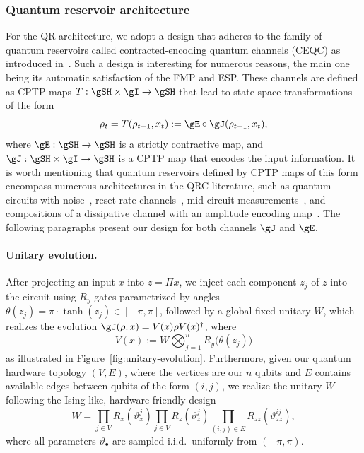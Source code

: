 \subsubsection{Quantum reservoir architecture}
For the QR architecture, we adopt a design that adheres to the family of quantum reservoirs called contracted-encoding quantum channels (CEQC) as introduced in~\cite{Martínez-Peña_Ortega_2025}. Such a design is interesting for numerous reasons, the main one being its automatic satisfaction of the FMP and ESP. These channels are defined as CPTP maps $T: \gSH \times \gI \to \gSH$ that lead to state-space transformations of the form
\begin{equation}\label{eq:CEQC}
    \rho_t = T(\rho_{t-1}, x_t) := \gE \circ \gJ(\rho_{t-1}, x_t),
\end{equation}
where $\gE: \gSH \to \gSH$ is a strictly contractive map, and $\gJ: \gSH \times \gI \to \gSH$ is a CPTP map that encodes the input information. It is worth mentioning that quantum reservoirs defined by CPTP maps of this form encompass numerous architectures in the QRC literature, such as quantum circuits with noise~\cite{Suzuki_2022, Kubota_2023}, reset-rate channels~\cite{Chen_Nurdin_Yamamoto_2020, Molteni_2023}, mid-circuit measurements~\cite{Yasuda_Suzuki_Kubota_Nakajima_Gao_Zhang_Shimono_Nurdin_Yamamoto_2023, Hu_2024}, and compositions of a dissipative channel with an amplitude encoding map~\cite{Mujal_2023}. The following paragraphs present our design for both channels $\gJ$ and $\gE$.

\paragraph{Unitary evolution.}
After projecting an input $x$ into $z = \Pi x$, we inject each component $z_j$ of $z$ into the circuit using $R_y$ gates parametrized by angles $\theta(z_j) = \pi \cdot \tanh(z_j) \in [-\pi, \pi]$, followed by a global fixed unitary $W$, which realizes the evolution $\gJ(\rho,x) = V(x) \rho V(x)^\dagger$, where
\begin{equation}\label{eq:unitary-design}
    V(x) := W \bigotimes_{j=1}^n R_y\big(\theta(z_j)\big)
\end{equation}
as illustrated in Figure~\ref{fig:unitary-evolution}. Furthermore, given our quantum hardware topology $(V, E)$, where the vertices are our $n$ qubits and $E$ contains available edges between qubits of the form $(i,j)$, we realize the unitary $W$ following the Ising-like, hardware-friendly design
\begin{equation}\label{eq:ising-unitary}
    W = \prod_{j \in V} R_x(\vartheta_{x}^j) \prod_{j \in V} R_z(\vartheta_{z}^j) \prod_{(i,j) \in E} R_{zz}(\vartheta_{zz}^{ij}),
\end{equation}
where all parameters $\vartheta_{\bullet}$ are sampled i.i.d.\ uniformly from $(-\pi, \pi)$.

